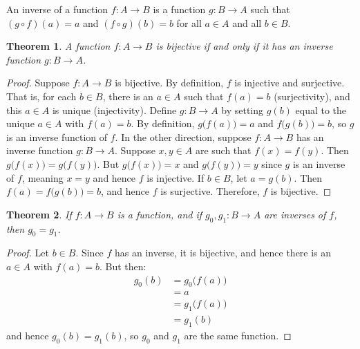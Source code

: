 \documentclass{article}
\theoremstyle{plain}
\newtheorem{theorem}{Theorem}[section]
\theoremstyle{normal}
\newenvironment{definition}{%
    \pushQED{\qed}\renewcommand{\qedsymbol}{$\blacksquare$}\definitionx%
}{%
    \popQED\enddefinitionx%
}
\begin{document}
        \begin{definition}[\textbf{Inverse Function}]
            An inverse of a function $f:A\rightarrow{B}$ is a function
            $g:B\rightarrow{A}$ such that $(g\circ{f})(a)=a$ and
            $(f\circ{g})(b)=b$ for all $a\in{A}$ and all $b\in{B}$.
        \end{definition}
        \begin{theorem}
            A function $f:A\rightarrow{B}$ is bijective if and only if it has
            an inverse function $g:B\rightarrow{A}$.
        \end{theorem}
        \begin{proof}
            Suppose $f:A\rightarrow{B}$ is bijective. By definition, $f$ is
            injective and surjective. That is, for each $b\in{B}$, there is
            an $a\in{A}$ such that $f(a)=b$ (surjectivity), and
            this $a\in{A}$ is unique (injectivity). Define $g:B\rightarrow{A}$
            by setting $g(b)$ equal to the unique $a\in{A}$ with
            $f(a)=b$. By definition, $g\big(f(a)\big)=a$ and
            $f\big(g(b)\big)=b$, so $g$ is an inverse function of $f$. In the
            other direction, suppose $f:A\rightarrow{B}$ has an inverse
            function $g:B\rightarrow{A}$. Suppose $x,y\in{A}$ are such
            that $f(x)=f(y)$. Then $g\big(f(x)\big)=g\big(f(y)\big)$.
            But $g\big(f(x)\big)=x$ and $g\big(f(y)\big)=y$ since $g$ is an
            inverse of $f$, meaning $x=y$ and hence $f$ is injective.
            If $b\in{B}$, let $a=g(b)$. Then $f(a)=f\big(g(b)\big)=b$, and
            hence $f$ is surjective. Therefore, $f$ is bijective.
        \end{proof}
        \begin{theorem}
            If $f:A\rightarrow{B}$ is a function, and if
            $g_{0},g_{1}:B\rightarrow{A}$ are inverses of $f$, then
            $g_{0}=g_{1}$.
        \end{theorem}
        \begin{proof}
            Let $b\in{B}$. Since $f$ has an inverse, it is bijective,
            and hence there is an $a\in{A}$ with $f(a)=b$. But then:
            \begin{align}
                g_{0}(b)&=g_{0}\big(f(a)\big)\\
                    &=a\\
                    &=g_{1}\big(f(a)\big)\\
                    &=g_{1}(b)
            \end{align}
            and hence $g_{0}(b)=g_{1}(b)$, so $g_{0}$ and $g_{1}$ are the
            same function.
        \end{proof}
\end{document}
